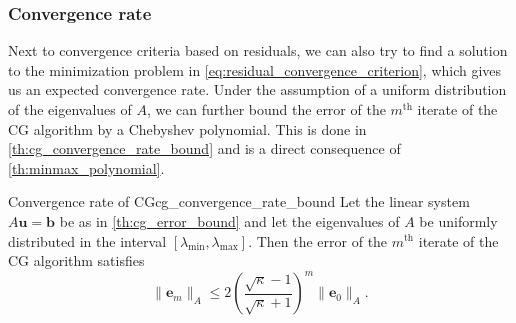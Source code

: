 \subsubsection{Convergence rate}
Next to convergence criteria based on residuals, we can also try to find a solution to the minimization problem in \cref{eq:residual_convergence_criterion}, which gives us an expected convergence rate. Under the assumption of a uniform distribution of the eigenvalues of $A$, we can further bound the error of the $m^{\text{th}}$ iterate of the CG algorithm by a Chebyshev polynomial. This is done in \cref{th:cg_convergence_rate_bound} and is a direct consequence of \cref{th:minmax_polynomial}.
\begin{fancyth}{Convergence rate of CG}{cg_convergence_rate_bound}
  Let the linear system $A\mathbf{u} = \mathbf{b}$ be as in \cref{th:cg_error_bound} and let the eigenvalues of $A$ be uniformly distributed in the interval $[\lambda_{\text{min}}, \lambda_{\text{max}}]$. Then the error of the $m^{\text{th}}$ iterate of the CG algorithm satisfies
  \begin{equation}
    \|\mathbf{e}_m\|_A \leq 2\left(\frac{\sqrt{\kappa} - 1}{\sqrt{\kappa} + 1}\right)^{m} \|\mathbf{e}_0\|_A.
    \label{eq:cg_convergence_rate_bound}
  \end{equation}
\end{fancyth}
